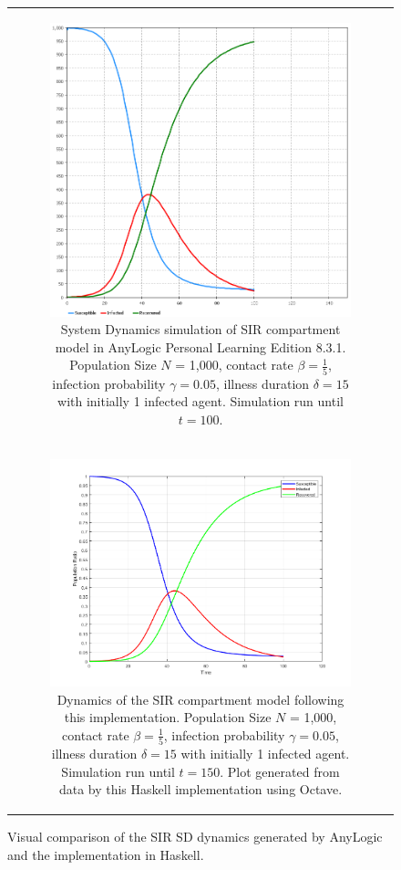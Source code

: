 \begin{figure}
\begin{center}
	\begin{tabular}{c}
		\begin{subfigure}[b]{1.0\textwidth}
			\centering
			\includegraphics[width=.6\textwidth, angle=0]{./fig/appendix/sdsimulation/SIR_SD_1000agents_100t_ANYLOGIC.png}
			\caption{System Dynamics simulation of SIR compartment model in AnyLogic Personal Learning Edition 8.3.1. Population Size $N$ = 1,000, contact rate $\beta = \frac{1}{5}$, infection probability $\gamma = 0.05$, illness duration $\delta = 15$ with initially 1 infected agent. Simulation run until $t = 100$.}
	\label{fig:sir_sd_anylogic}
		\end{subfigure}
		
		\\
    	
		\begin{subfigure}[b]{1.0\textwidth}
			\centering
			\includegraphics[width=.7\textwidth, angle=0]{./fig/appendix/sdsimulation/SIR_SD_1000agents_100t_0001dt.png}
			\caption{Dynamics of the SIR compartment model following this implementation. Population Size $N$ = 1,000, contact rate $\beta =  \frac{1}{5}$, infection probability $\gamma = 0.05$, illness duration $\delta = 15$ with initially 1 infected agent. Simulation run until $t = 150$. Plot generated from data by this Haskell implementation using Octave.}
			\label{fig:sir_sd_haskell_dynamics}
		\end{subfigure}
	\end{tabular}
	
	\caption{Visual comparison of the SIR SD dynamics generated by AnyLogic and the implementation in Haskell.} 
	\label{fig:sir_sd_haskell_vs_anylogic}
\end{center}
\end{figure}

